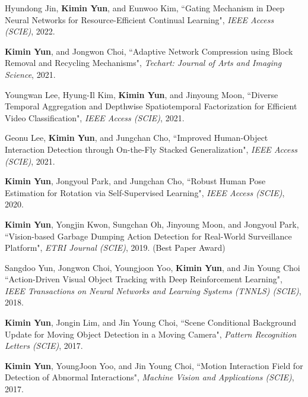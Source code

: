 \documentclass[10pt]{article}
\makeatletter
\newlength{\bibhang}
\newlength{\bibsep}
 {\@listi \global\bibsep\itemsep \global\advance\bibsep by\parsep}
\newenvironment{bibsection}%
        {\vspace{-\baselineskip}\begin{list}{}{%
       \setlength{\leftmargin}{\bibhang}%
       \setlength{\itemindent}{-\leftmargin}%
       \setlength{\itemsep}{\bibsep}%
       \setlength{\parsep}{\z@}%
        \setlength{\partopsep}{0pt}%
        \setlength{\topsep}{0pt}}}
        {\end{list}\vspace{-.6\baselineskip}}
\makeatother
\begin{document}
\begin{bibsection}
\item Hyundong Jin, \textbf{Kimin Yun}, and Eunwoo Kim, 
				``Gating Mechanism in Deep Neural Networks for Resource-Efficient Continual Learning",
				\emph{IEEE Access (SCIE)}, 2022. 

    \item \textbf{Kimin Yun}, and Jongwon Choi, 
				``Adaptive Network Compression using Block Removal and Recycling Mechanisms",
				\emph{Techart: Journal of Arts and Imaging Science}, 2021.  


\item Youngwan Lee, Hyung-Il Kim, \textbf{Kimin Yun}, and Jinyoung Moon, 
				``Diverse Temporal Aggregation and Depthwise Spatiotemporal Factorization for Efficient Video Classification",
				\emph{IEEE Access (SCIE)}, 2021.  

	    \item Geonu Lee, \textbf{Kimin Yun}, and Jungchan Cho, 
				``Improved Human-Object Interaction Detection through On-the-Fly Stacked Generalization",
				\emph{IEEE Access (SCIE)}, 2021.  

		\item \textbf{Kimin Yun}, Jongyoul Park, and Jungchan Cho, 
				``Robust Human Pose Estimation for Rotation via Self-Supervised Learning",
				\emph{IEEE Access (SCIE)}, 2020.  

		\item \textbf{Kimin Yun}, Yongjin Kwon, Sungchan Oh, Jinyoung Moon, and Jongyoul Park,
				``Vision-based Garbage Dumping Action Detection for Real-World Surveillance Platform",
				\emph{ETRI Journal (SCIE)}, 2019. (Best Paper Award)

		\item  Sangdoo Yun, Jongwon Choi, Youngjoon Yoo, \textbf{Kimin Yun}, and Jin Young Choi
				``Action-Driven Visual Object Tracking with Deep Reinforcement Learning",
				\emph{IEEE Transactions on Neural Networks and Learning Systems (TNNLS) (SCIE)}, 2018.  


		\item \textbf{Kimin Yun}, Jongin Lim, and Jin Young Choi,
				``Scene Conditional Background Update for Moving Object Detection in a Moving Camera",
				\emph{Pattern Recognition Letters (SCIE)}, 2017.  


		\item  \textbf{Kimin Yun}, YoungJoon Yoo, and Jin Young Choi,
				``Motion Interaction Field for Detection of Abnormal Interactions",
				\emph{Machine Vision and Applications (SCIE)}, 2017.



\end{bibsection}
\end{document}
